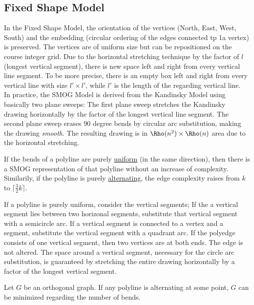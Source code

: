 \subsection{Fixed Shape Model}
In the Fixed Shape Model, the orientation of the vertices (North, East, West, South) and the embedding (circular ordering of the edges connected tp 1a vertex) is preserved. The vertices are of uniform size but can be repositioned on the course integer grid. Due to the horizontal stretching technique by the factor of $l$ (longest vertical segment), there is new space left and right from every vertical line segment. To be more precise, there is an empty box left and right from every vertical line with size $l'\times l'$, while $l'$ is the length of the regarding vertical line.\\
In practice, the SMOG Model is derived from the Kandinsky Model using basically two plane sweeps: The first plane sweep stretches the Kandinsky drawing horizontally by the factor of the longest vertical line segment. The second plane sweep erases 90 degree bends by circular arc substitution, making the drawing \textit{smooth}. The resulting drawing is in $\Rho(n^2) \times \Rho(n)$ area due to the horizontal stretching.
\begin{theorem}
	If the bends of a polyline are purely \underline{uniform} (in the same direction), then there is a SMOG representation of that polyline without an increase of complexity. Similarily, if the polyline is purely \underline{alternating}, the edge complexity raises from $k$ to $\lceil\frac{3}{2}k\rceil$.
\end{theorem}
\begin{sketch}
	If a polyline is purely uniform, consider the vertical segments; If the a vertical segment lies between two horizonal segments, substitute that vertical segment with a semicircle arc. If a vertical segment is connected to a vertex and a segment, substitute the vertical segment with a quadrant arc. If the polyedge consists of one vertical segment, then two vertices are at both ends. The edge is not altered. The space around a vertical segment, necessary for the circle arc substitution, is guaranteed by stretching the entire drawing horizontally by a factor of the longest vertical segment.
\end{sketch}
\begin{theorem}
	Let $G$ be an orthogonal graph. If any polyline is alternating at some point, $G$ can be minimized regarding the number of bends. \label{th:alt_not_min}
\end{theorem}
